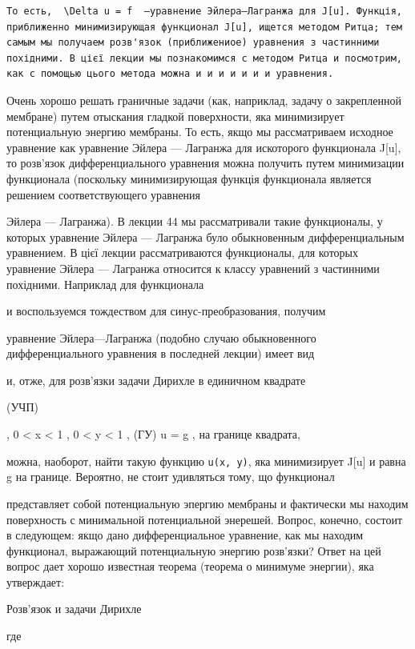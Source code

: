 \documentclass[
  ukrainian,
]{article}
\begin{document}
\begin{verbatim}
То есть,  \Delta u = f  —уравнение Эйлера—Лагранжа для J[u]. Функція, приближенно минимизирующая функционал J[u], ищется методом Ритца; тем самым мы получаем розв'язок (приближениое) уравнения з частинними похідними. В цієї лекции мы познакомимся с методом Ритца и посмотрим, как с помощью цього метода можна и и и и и и и уравнения.
\end{verbatim}

Очень хорошо решать граничные задачи (как, наприклад, задачу о
закрепленной мембране) путем отыскания гладкой поверхности, яка
минимизирует потенциальную энергию мембраны. То есть, якщо мы
рассматриваем исходное уравнение как уравнение Эйлера --- Лагранжа для
искоторого функционала J{[}u{]}, то розв'язок дифференциального
уравнения можна получить путем минимизации функционала (поскольку
минимизирующая функція функционала является решением соответствующего
уравнения

Эйлера --- Лагранжа). В лекции 44 мы рассматривали такие функционалы, у
которых уравнение Эйлера --- Лагранжа було обыкновенным дифференциальным
уравнением. В цієї лекции рассматриваются функционалы, для которых
уравнение Эйлера --- Лагранжа относится к классу уравнений з частинними
похідними. Наприклад для функционала

и воспользуемся тождеством для синус-преобразования, получим

уравнение Эйлера---Лагранжа (подобно случаю обыкновенного
дифференциального уравнения в последней лекции) имеет вид

и, отже, для розв'язки задачи Дирихле в единичном квадрате

(УЧП)

, 0 \textless{} x \textless{} 1 , 0 \textless{} y \textless{} 1 , (ГУ) u
= g , на границе квадрата,

можна, наоборот, найти такую функцию \texttt{u(x,\ y)}, яка минимизирует
J{[}u{]} и равна g на границе. Вероятно, не стоит удивляться тому, що
функционал

представляет собой потенциальную эпергию мембраны и фактически мы
находим поверхность с минимальной потенциальной энерешей. Вопрос,
конечно, состоит в следующем: якщо дано дифференциальное уравнение, как
мы находим функционал, выражающий потенциальную энергию розв'язки? Ответ
на цей вопрос дает хорошо известная теорема (теорема о минимуме
энергии), яка утверждает:

Розв'язок и задачи Дирихле

где
\end{document}
